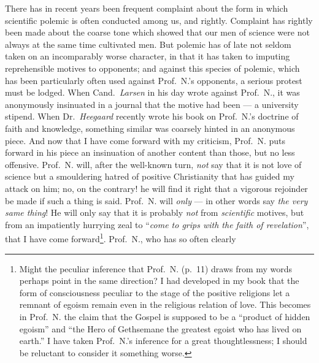 \documentclass[12pt,a4paper]{book}
\begin{document}
There has in recent years been frequent complaint about the form in which
scientific polemic is often conducted among us, and rightly. Complaint has
rightly been made about the coarse tone which showed that our men of science were
not always at the same time cultivated men. But polemic has of late not seldom
taken on an incomparably worse character, in that it has taken to imputing
reprehensible motives to opponents; and against this species of polemic, which
has been particularly often used against Prof.\ N.'s opponents, a serious protest
must be lodged. When Cand.\ \emph{Larsen} in his day wrote against Prof.\ N., it
was anonymously insinuated in a journal that the motive had been --- a university
stipend. When Dr.\ \emph{Heegaard} recently wrote his book on Prof.\ N.'s
doctrine of faith and knowledge,
something similar was coarsely hinted in an anonymous piece. And now that I have
come forward with my criticism, Prof.\ N. puts forward in his piece an
insinuation of another content than those, but no less offensive. Prof.\ N. will,
after the well-known turn, \emph{not} say that it is not love of science but a
smouldering hatred of positive Christianity that has guided my attack on him; no,
on the contrary! he will find it right that a vigorous rejoinder be made if such
a thing is said. Prof.\ N. will \emph{only} --- in other words say
\emph{the very same thing}! He will only say that it is probably \emph{not} from
\emph{scientific} motives, but from an impatiently hurrying zeal to
``\emph{come to grips with the faith of
\setcounter{footnote}{0}%
revelation}'', that I have come forward\footnote{%
  Might the peculiar inference that Prof.\ N. (p.\ 11) draws from my words
  perhaps point in the same direction? I had developed in my book that the form
  of consciousness peculiar to the stage of the positive religions let a remnant
  of egoism remain even in the religious relation of love. This becomes in Prof.\
  N. the claim that the Gospel is supposed to be a ``product of hidden egoism''
  and ``the Hero of Gethsemane the greatest egoist who has lived on earth.'' I
  have taken Prof.\ N.'s inference for a great thoughtlessness; I should be
  reluctant to consider it something worse.}. Prof.\ N., who has so often clearly
\end{document}
